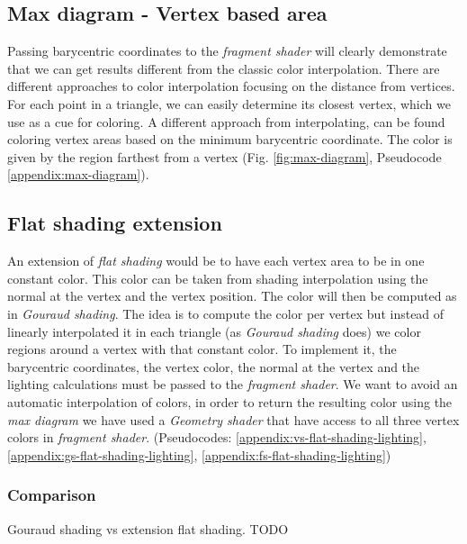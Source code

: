 
\subsection{Max diagram - Vertex based area} \label{section:max-diagram}
Passing barycentric coordinates to the \textit{fragment shader} will clearly demonstrate that we can get results different from the classic color interpolation.
\cite{WEBSITE:redbloggames}
There are different approaches to color interpolation focusing on the distance from vertices. For each point in a triangle, we can easily determine its closest vertex, which we use as a cue for coloring.
A different approach from interpolating, can be found coloring vertex areas based on the minimum barycentric coordinate.
The color is given by the region farthest from a vertex (Fig. \ref{fig:max-diagram}, Pseudocode \ref{appendix:max-diagram}).


\subsection{Flat shading extension} \label{section:extend-flat-shading-lighting}
An extension of \textit{flat shading} would be to have each vertex area to be in one constant color. This color can be taken from shading interpolation using the normal at the vertex and the vertex position.
The color will then be computed as in \textit{Gouraud shading}.
The idea is to compute the color per vertex but instead of linearly interpolated it in each triangle (as \textit{Gouraud shading} does) we color regions around a vertex with that constant color.
To implement it, the barycentric coordinates, the vertex color, the normal at the vertex and the lighting calculations must be passed to the \textit{fragment shader}.
We want to avoid an automatic interpolation of colors, in order to return the resulting color using the \textit{max diagram} we have used a \textit{Geometry shader} that have access to all three vertex colors in \textit{fragment shader}. (Pseudocodes: \ref{appendix:vs-flat-shading-lighting}, \ref{appendix:gs-flat-shading-lighting}, \ref{appendix:fs-flat-shading-lighting})

\subsubsection{Comparison}
Gouraud shading vs extension flat shading.
TODO

